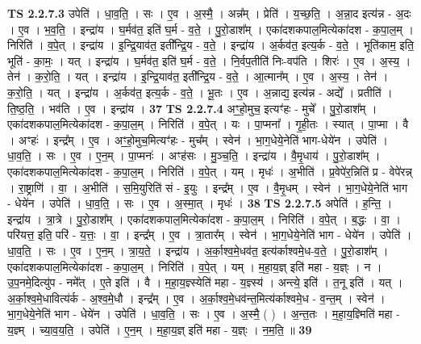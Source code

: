 \documentclass[17pt]{extarticle}
\begin{document}
                  \newline
                                \textbf{ TS 2.2.7.3} \newline
                  उपेति॑ । धा॒व॒ति॒ । सः । ए॒व । अ॒स्मै॒ । अन्न᳚म् । प्रेति॑ । य॒च्छ॒ति॒ । अ॒न्ना॒द इत्य॑न्न - अ॒दः । ए॒व । भ॒व॒ति॒ । इन्द्रा॑य । घ॒र्मव॑त॒ इति॑ घ॒र्म - व॒ते॒ । पु॒रो॒डाश᳚म् । एका॑दशकपाल॒मित्येका॑दश - क॒पा॒ल॒म् । निरिति॑ । व॒पे॒त् । इन्द्रा॑य । इ॒न्द्रि॒याव॑त॒ इती᳚न्द्रि॒य - व॒ते॒ । इन्द्रा॑य । अ॒र्कव॑त॒ इत्य॒र्क - व॒ते॒ । भूति॑काम॒ इति॒ भूति॑ - का॒मः॒ । यत् । इन्द्रा॑य । घ॒र्मव॑त॒ इति॑ घ॒र्म - व॒ते॒ । नि॒र्वप॒तीति॑ निः-वप॑ति । शिरः॑ । ए॒व । अ॒स्य॒ । तेन॑ । क॒रो॒ति॒ । यत् । इन्द्रा॑य । इ॒न्द्रि॒याव॑त॒ इती᳚न्द्रि॒य - व॒ते॒ । आ॒त्मान᳚म् । ए॒व । अ॒स्य॒ । तेन॑ । क॒रो॒ति॒ । यत् । इन्द्रा॑य । अ॒र्कव॑त॒ इत्य॒र्क - व॒ते॒ । भू॒तः । ए॒व । अ॒न्नाद्य॒ इत्य॑न्न - अद्ये᳚ । प्रतीति॑ । ति॒ष्ठ॒ति॒ । भव॑ति । ए॒व । इन्द्रा॑य । \textbf{  37} \newline
                  \newline
                                \textbf{ TS 2.2.7.4} \newline
                  अꣳ॒॒हो॒मुच॒ इत्यꣳ॑हः - मुचे᳚ । पु॒रो॒डाश᳚म् । एका॑दशकपाल॒मित्येका॑दश - क॒पा॒ल॒म् । निरिति॑ । व॒पे॒त् । यः । पा॒प्मना᳚ । गृ॒ही॒तः । स्यात् । पा॒प्मा । वै । अꣳहः॑ । इन्द्र᳚म् । ए॒व । अꣳ॒॒हो॒मुच॒मित्यꣳ॑हः - मुच᳚म् । स्वेन॑ । भा॒ग॒धेये॒नेति॑ भाग-धेये॑न । उपेति॑ । धा॒व॒ति॒ । सः । ए॒व । ए॒न॒म् । पा॒प्मनः॑ । अꣳह॑सः । मु॒ञ्च॒ति॒ । इन्द्रा॑य । वै॒मृ॒धाय॑ । पु॒रो॒डाश᳚म् । एका॑दशकपाल॒मित्येका॑दश - क॒पा॒ल॒म् । निरिति॑ । व॒पे॒त् । यम् । मृधः॑ । अ॒भीति॑ । प्र॒वेपे॑र॒न्निति॑ प्र - वेपे॑रन्न् । रा॒ष्ट्राणि॑ । वा॒ । अ॒भीति॑ । स॒मि॒युरिति॑ सं - इ॒युः । इन्द्र᳚म् । ए॒व । वै॒मृ॒धम् । स्वेन॑ । भा॒ग॒धेये॒नेति॑ भाग - धेये॑न । उपेति॑ । धा॒व॒ति॒ । सः । ए॒व । अ॒स्मा॒त् । मृधः॑ । \textbf{  38} \newline
                  \newline
                                \textbf{ TS 2.2.7.5} \newline
                  अपेति॑ । ह॒न्ति॒ । इन्द्रा॑य । त्रा॒त्रे । पु॒रो॒डाश᳚म् । एका॑दशकपाल॒मित्येका॑दश - क॒पा॒ल॒म् । निरिति॑ । व॒पे॒त् । ब॒द्धः । वा॒ । परि॑यत्त॒ इति॒ परि॑ - य॒त्तः॒ । वा॒ । इन्द्र᳚म् । ए॒व । त्रा॒तार᳚म् । स्वेन॑ । भा॒ग॒धेये॒नेति॑ भाग - धेये॑न । उपेति॑ । धा॒व॒ति॒ । सः । ए॒व । ए॒न॒म् । त्रा॒य॒ते॒ । इन्द्रा॑य । अ॒र्का॒श्व॒मे॒धव॑त॒ इत्य॑र्काश्वमे॒ध-व॒ते॒ । पु॒रो॒डाश᳚म् । एका॑दशकपाल॒मित्येका॑दश - क॒पा॒ल॒म् । निरिति॑ । व॒पे॒त् । यम् । म॒हा॒य॒ज्ञ् इति॑ महा - य॒ज्ञ्ः । न । उ॒प॒नमे॒दित्यु॑प - नमे᳚त् । ए॒ते इति॑ । वै । म॒हा॒य॒ज्ञ्स्येति॑ महा - य॒ज्ञ्स्य॑ । अन्त्ये॒ इति॑ । त॒नू इति॑ । यत् । अ॒र्का॒श्व॒मे॒धावित्य॑र्क - अ॒श्व॒मे॒धौ । इन्द्र᳚म् । ए॒व । अ॒र्का॒श्व॒मे॒धव॑न्त॒मित्य॑र्काश्वमे॒ध - व॒न्त॒म् । स्वेन॑ । भा॒ग॒धेये॒नेति॑ भाग - धेये॑न । उपेति॑ । धा॒व॒ति॒ । सः । ए॒व । अ॒स्मै॒ ( ) । अ॒न्त॒तः । म॒हा॒य॒ज्ञ्मिति॑ महा - य॒ज्ञ्म् । च्या॒व॒य॒ति॒ । उपेति॑ । ए॒न॒म् । म॒हा॒य॒ज्ञ् इति॑ महा - य॒ज्ञ्ः । न॒म॒ति॒ ॥ \textbf{  39} \newline
\end{document}
